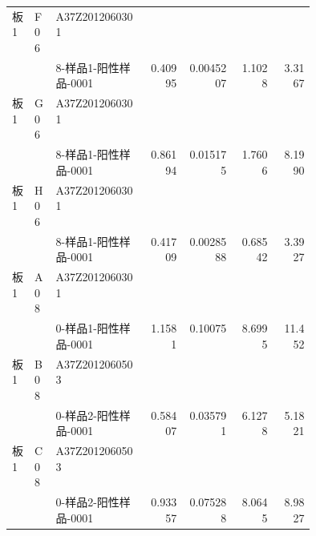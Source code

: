 \documentclass[UTF8,10pt,a4paper,fontset=fandol]{ctexart}
\newcommand{\fieldvalue}[1]{#1}
\begin{document}
\begin{small}
\begin{tabular}{p{0.07\linewidth}p{0.07\linewidth}p{0.30\linewidth}rrrr}
板1 & F06 & A37Z2012060301\\[-2pt]
    &     & 8-样品1-阳性样品-0001 &
\fieldvalue{0.40995} &
\fieldvalue{0.0045207} &
\fieldvalue{1.1028} &
\fieldvalue{3.3167} \\

板1 & G06 & A37Z2012060301\\[-2pt]
    &     & 8-样品1-阳性样品-0001 &
\fieldvalue{0.86194} &
\fieldvalue{0.015175} &
\fieldvalue{1.7606} &
\fieldvalue{8.1990} \\

板1 & H06 & A37Z2012060301\\[-2pt]
    &     & 8-样品1-阳性样品-0001 &
\fieldvalue{0.41709} &
\fieldvalue{0.0028588} &
\fieldvalue{0.68542} &
\fieldvalue{3.3927} \\

板1 & A08 & A37Z2012060301\\[-2pt]
    &     & 0-样品1-阳性样品-0001 &
\fieldvalue{1.1581} &
\fieldvalue{0.10075} &
\fieldvalue{8.6995} &
\fieldvalue{11.452} \\

板1 & B08 & A37Z2012060503\\[-2pt]
    &     & 0-样品2-阳性样品-0001 &
\fieldvalue{0.58407} &
\fieldvalue{0.035791} &
\fieldvalue{6.1278} &
\fieldvalue{5.1821} \\

板1 & C08 & A37Z2012060503\\[-2pt]
    &     & 0-样品2-阳性样品-0001 &
\fieldvalue{0.93357} &
\fieldvalue{0.075288} &
\fieldvalue{8.0645} &
\fieldvalue{8.9827} \\


\end{tabular}
\end{small}
\end{document}
